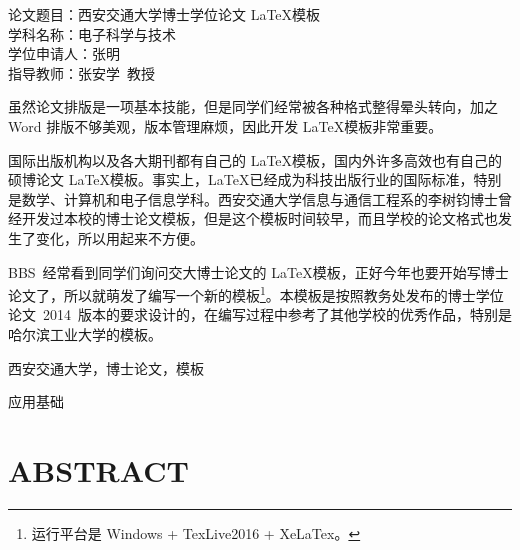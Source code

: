 
\titlespacing{\chapter}{0pt}{23mm}{6mm}
\setcounter{page}{1}

\vskip-50mm
{\xiaosi\hei 
	\noindent 论文题目：西安交通大学博士学位论文 \LaTeX 模板 \\
	\noindent 学科名称：电子科学与技术 \\
	\noindent 学位申请人：张明 \\
	\noindent 指导教师：张安学~教授
}
\vskip22mm

虽然论文排版是一项基本技能，但是同学们经常被各种格式整得晕头转向，加之 Word 排版不够美观，版本管理麻烦，因此开发 \LaTeX 模板非常重要。

国际出版机构以及各大期刊都有自己的 \LaTeX 模板，国内外许多高效也有自己的硕博论文 \LaTeX 模板。事实上，\LaTeX 已经成为科技出版行业的国际标准，特别是数学、计算机和电子信息学科。西安交通大学信息与通信工程系的李树钧博士曾经开发过本校的博士论文模板，但是这个模板时间较早，而且学校的论文格式也发生了变化，所以用起来不方便。

BBS~经常看到同学们询问交大博士论文的 \LaTeX 模板，正好今年也要开始写博士论文了，所以就萌发了编写一个新的模板\footnote{运行平台是 \color{red}Windows + TexLive2016 + XeLaTex。}。本模板是按照教务处发布的博士学位论文~2014~版本的要求设计的，在编写过程中参考了其他学校的优秀作品，特别是哈尔滨工业大学的模板。

\vspace{\baselineskip}
 西安交通大学，博士论文，模板

\vspace{\baselineskip}
 应用基础
\clearpage

\titlespacing{\chapter}{0pt}{20.5mm}{5mm}
\chapter*{ABSTRACT}
{}


